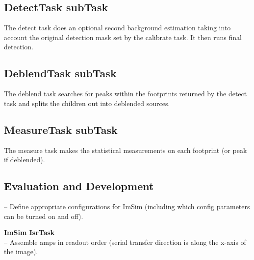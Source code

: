 \documentclass[prd, nofootinbib, floatfix, 11pt,tightenlines,times]{article}
\begin{document}
\subsection{DetectTask subTask}
The detect task does an optional second background estimation taking
into account the original detection mask set by the calibrate task.
It then runs final detection.

\subsection{DeblendTask subTask}
The deblend task searches for peaks within the footprints returned by
the detect task and splits the children out into deblended sources.

\subsection{MeasureTask subTask}
The measure task makes the statistical measurements on each footprint (or peak if deblended).

\subsection{Evaluation and Development}

-- Define appropriate configurations for ImSim (including which config
parameters can be turned on and off).

{\bf ImSim IsrTask}\\
-- Assemble amps in readout order (serial transfer direction is along the x-axis of the image).


\end{document}

